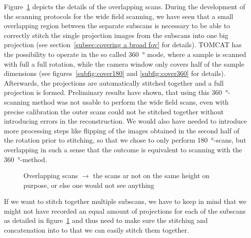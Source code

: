 Figure~\ref{fig:overlapping scans} depicts the details of the overlapping scans. During the development of the scanning protocols for the wide field scanning, we have seen that a small overlapping region between the separate subscans is necessary to be able to correctly stitch the single projection images from the subscans into one big projection (see section~\ref{subsec:covering a broad fov} for details). TOMCAT has the possibility to operate in the so called \SI{360}{\degree} mode, where a sample is scanned with full a full rotation, while the camera window only covers half of the sample dimensions (see figures~\ref{subfig:cover180} and \ref{subfig:cover360} for details). Afterwards, the projections are automatically stitched together and a full projection is formed. Preliminary results have shown, that using this \SI{360}{\degree}-scanning method was not usable to perform the wide field scans, even with precise calibration the outer scans could not be stitched together without introducing errors in the reconstruction. We would also have needed to introduce more processing steps like flipping of the images obtained in the second half of the rotation prior to stitching, so that we chose to only perform \SI{180}{\degree}-scans, but overlapping in such a sense that the outcome is equivalent to scanning with the \SI{360}{\degree}-method.

\begin{figure}[tb]
	\centering
	
	\caption{Overlapping scans $\rightarrow$ the scans ar not on the same height on purpose, or else one would not see anything}
	\label{fig:overlapping scans}
\end{figure}	

If we want to stitch together multiple subscans,  we have to keep in mind that we might not have recorded an equal amount of projections for each of the subscans as detailed in figure~\ref{fig:overlapping scans} and thus need to make sure the stitching and concatenation into to that we can easily stitch them together.


